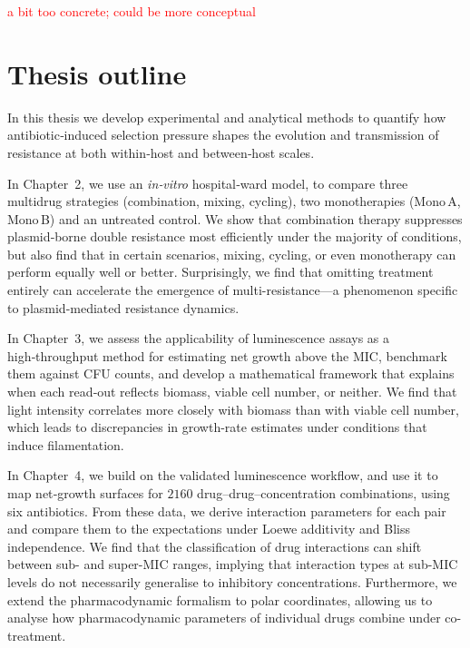 \documentclass[../main.tex]{subfiles}
\begin{document}
\textcolor{red}{a bit too concrete; could be more conceptual}

\section{Thesis outline}

In this thesis we develop experimental and analytical methods to quantify how antibiotic‑induced
selection pressure shapes the evolution and transmission of resistance at both within‑host and between‑host scales.

In Chapter~2, we use an \textit{in‑vitro} hospital‑ward model, to compare three multidrug strategies (combination, mixing, cycling), two monotherapies (Mono A, Mono B) and an untreated control.
We show that combination therapy suppresses plasmid‑borne double resistance most
efficiently under the majority of conditions, but also find that in certain scenarios, mixing, cycling, or even monotherapy can perform equally well or better.
Surprisingly, we find that omitting treatment entirely can accelerate the emergence of multi-resistance—a phenomenon specific to plasmid-mediated resistance dynamics.

In Chapter~3, we assess the applicability of luminescence assays as a high‑throughput method for estimating net growth above the MIC, benchmark them against CFU counts, and develop a mathematical framework that explains when each read‑out reflects biomass, viable cell number, or neither.
We find that light intensity correlates more closely with biomass than with viable cell number, which leads to discrepancies in growth-rate estimates under conditions that induce filamentation.

In Chapter~4, we build on the validated luminescence workflow, and use it to map net‑growth surfaces for $2160$ drug–drug–concentration combinations, using six antibiotics.
From these data, we derive interaction parameters for each pair and compare them to the expectations under Loewe additivity and Bliss independence.
We find that the classification of drug interactions can shift between sub- and super-MIC ranges, implying that interaction types at sub-MIC levels do not necessarily generalise to inhibitory concentrations.
Furthermore, we extend the pharmacodynamic formalism to polar coordinates, allowing us to analyse how pharmacodynamic parameters of individual drugs combine under co-treatment.

\chapterbibliography
\end{document}
